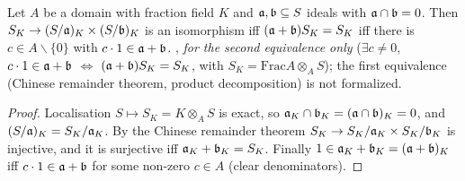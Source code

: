 \begin{lemma}\label{lem:s06-split}
Let $A$ be a domain with fraction field $K$ and $\mathfrak{a},\mathfrak{b}\subseteq S$ ideals with $\mathfrak{a}\cap\mathfrak{b}=0$. Then
$S_K\to(S/\mathfrak{a})_K\times(S/\mathfrak{b})_K$ is an isomorphism iff $(\mathfrak{a}+\mathfrak{b})S_K=S_K$ iff there is $c\in A\smallsetminus\{0\}$ with
$c\cdot1\in\mathfrak{a}+\mathfrak{b}$. \stproved{} , \stformalized{} \emph{for the second equivalence only} ($\exists c\ne0$, $c\cdot1\in\mathfrak{a}+\mathfrak{b}$ $\iff$ $(\mathfrak{a}+\mathfrak{b})S_K=S_K$, with $S_K=\mathrm{Frac}A\otimes_AS$); the first equivalence (Chinese remainder theorem, product decomposition) is not formalized.
\end{lemma}
\begin{proof}
Localisation $S\mapsto S_K=K\otimes_AS$ is exact, so $\mathfrak{a}_K\cap\mathfrak{b}_K=(\mathfrak{a}\cap\mathfrak{b})_K=0$, and $(S/\mathfrak{a})_K=S_K/\mathfrak{a}_K$. By the Chinese remainder
theorem $S_K\to S_K/\mathfrak{a}_K\times S_K/\mathfrak{b}_K$ is injective, and it is surjective iff $\mathfrak{a}_K+\mathfrak{b}_K=S_K$. Finally $1\in\mathfrak{a}_K+\mathfrak{b}_K=(\mathfrak{a}+\mathfrak{b})_K$
iff $c\cdot1\in\mathfrak{a}+\mathfrak{b}$ for some non-zero $c\in A$ (clear denominators).
\end{proof}

